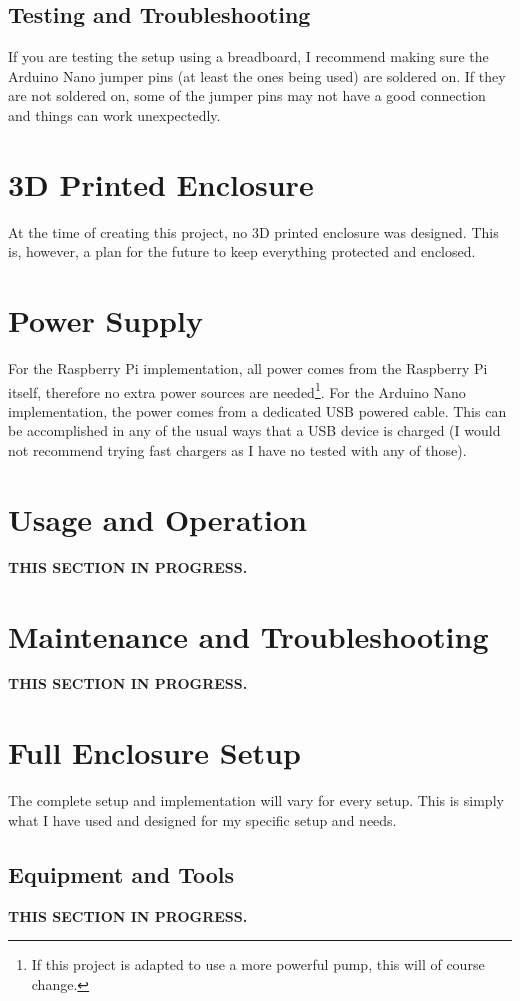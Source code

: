 \documentclass{article}
\begin{document}
\begin{multicols}{2}
		\subsection{Testing and Troubleshooting}
		If you are testing the setup using a breadboard, I recommend making sure the Arduino Nano jumper pins (at least the ones being used) are soldered on. If they are not soldered on, some of the jumper pins may not have a good connection and things can work unexpectedly.
		
		\section{3D Printed Enclosure}
		At the time of creating this project, no 3D printed enclosure was designed. This is, however, a plan for the future to keep everything protected and enclosed.
		
		\section{Power Supply}
		For the Raspberry Pi implementation, all power comes from the Raspberry Pi itself, therefore no extra power sources are needed\footnote{If this project is adapted to use a more powerful pump, this will of course change.}. For the Arduino Nano implementation, the power comes from a dedicated USB powered cable. This can be accomplished in any of the usual ways that a USB device is charged (I would not recommend trying fast chargers as I have no tested with any of those).
		
		\section{Usage and Operation}
		\textbf{THIS SECTION IN PROGRESS.}
		
		\section{Maintenance and Troubleshooting}
		\textbf{THIS SECTION IN PROGRESS.}
		
		\section{Full Enclosure Setup}		
		The complete setup and implementation will vary for every setup. This is simply what I have used and designed for my specific setup and needs.
		
			\subsection{Equipment and Tools}
			\textbf{THIS SECTION IN PROGRESS.}
			

\end{multicols}
\end{document}
